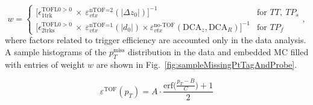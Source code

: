 \begin{equation}\label{eq:tagAndProbeWeight}%
w=\left\{
\begin{array}{ll}
\Big[\epsilon^{\text{TOFL0}>0}_{1\text{trk}}~\times~\varepsilon_{vtx}^{\text{nTOF=2}}(|\Delta z_{0}|)\Big]^{-1} & \textrm{for~}TT,~TP_{s}\\[3pt]
\Big[\epsilon^{\text{TOFL0}>0}_{2\text{trks}}~\times~\varepsilon_{vtx}^{\text{nTOF=1}}(|d_{0}|)\times \varepsilon_{vtx}^{\text{no-TOF}}(\text{DCA}_{z},\text{DCA}_{R})\Big]^{-1} & \textrm{for~}TP_{f}
\end{array}
\right.,
\end{equation}
where factors related to trigger efficiency are accounted only in the data analysis. A sample histograms of the $p_{T}^{\text{miss}}$ distribution in the data and embedded MC filled with entries of weight $w$ are shown in Fig.~\ref{fig:sampleMissingPtTagAndProbe}.

\begin{equation}\label{eq:tofEffFunc}
 \varepsilon^{\text{TOF}}(p_{T}) = A\cdot \frac{\text{erf}\Big(\frac{p_{T}-B}{C}\Big) + 1}{2}
\end{equation}








